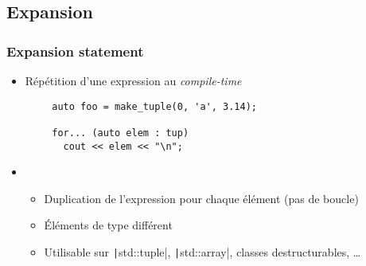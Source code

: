 \documentclass[C++.tex]{subfiles}
\begin{document}
\subsection*{Expansion}
\begin{frame}[fragile]
	\frametitle{Expansion statement}
	\begin{itemize}
		\item Répétition d'une expression au \textit{compile-time}
	\end{itemize}

	\begin{verbatim}
		auto foo = make_tuple(0, 'a', 3.14);

		for... (auto elem : tup)  
		  cout << elem << "\n";
	\end{verbatim}

	\begin{itemize}
		\item [] 
		\begin{itemize}
			\item Duplication de l'expression pour chaque élément (pas de boucle)
			\item Éléments de type différent
			\item Utilisable sur \texttt|std::tuple|, \texttt|std::array|, classes destructurables, \ldots{}
		\end{itemize}
	\end{itemize}
\end{frame}
\end{document}

